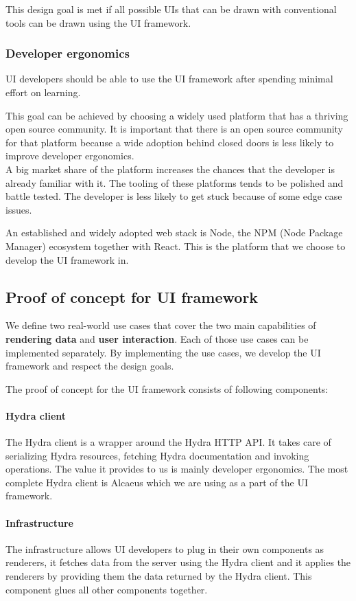 This design goal is met if all possible UIs that can be drawn with conventional tools can be drawn using the UI framework.

\subsubsection{Developer ergonomics}
UI developers should be able to use the UI framework after spending minimal effort on learning.

This goal can be achieved by choosing a widely used platform that has a thriving open source community. It is important that there is an open source community for that platform because a wide adoption behind closed doors is less likely to improve developer ergonomics. \\
A big market share of the platform increases the chances that the developer is already familiar with it. The tooling of these platforms tends to be polished and battle tested. The developer is less likely to get stuck because of some edge case issues.

An established and widely adopted web stack is Node, the NPM (Node Package Manager) ecosystem together with React. This is the platform that we choose to develop the UI framework in.

\subsection{Proof of concept for UI framework}\label{proofofconcept}
We define two real-world use cases that cover the two main capabilities of \textbf{rendering data} and \textbf{user interaction}. Each of those use cases can be implemented separately. By implementing the use cases, we develop the UI framework and respect the design goals.

The proof of concept for the UI framework consists of following components:

\paragraph{Hydra client}
The Hydra client is a wrapper around the Hydra HTTP API. It takes care of serializing Hydra resources, fetching Hydra documentation and invoking operations. The value it provides to us is mainly developer ergonomics. The most complete Hydra client is Alcaeus which we are using as a part of the UI framework.

\paragraph{Infrastructure}
The infrastructure allows UI developers to plug in their own components as renderers, it fetches data from the server using the Hydra client and it applies the renderers by providing them the data returned by the Hydra client. This component glues all other components together.

